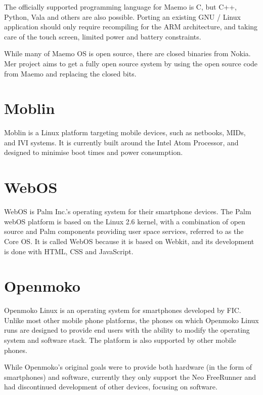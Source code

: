 \documentclass[12pt]{article}
\begin{document}

The officially supported programming language for Maemo is C, but C++, Python, Vala and others are also possible. Porting an existing GNU / Linux application should only require recompiling for the ARM architecture, and taking care of the touch screen, limited power and battery constraints.

While many of Maemo OS is open source, there are closed binaries from Nokia. Mer project aims to get a fully open source system by using the open source code from Maemo and replacing the closed bits\cite{maemo:mer}. 

\section{Moblin}

Moblin is a Linux platform targeting mobile devices, such as netbooks, MIDs, and IVI systems. It is currently built around the Intel Atom Processor, and designed to minimise boot times and power consumption\cite{moblin:about, wiki:moblin}.

\section{WebOS}

\nocite{wiki:WebOS}
WebOS is Palm Inc.'s operating system for their smartphone devices. The Palm webOS platform is based on the Linux 2.6 kernel, with a combination of open source\cite{WebOS:OSS} and Palm components providing user space services, referred to as the Core OS\cite{WebOS:architecture}. It is called WebOS because it is based on Webkit, and its development is done with HTML, CSS and JavaScript\cite{WebOS:developing}.

\section{Openmoko}

Openmoko Linux is an operating system for smartphones developed by FIC. Unlike most other mobile phone platforms, the phones on which Openmoko Linux runs are designed to provide end users with the ability to modify the operating system and software stack\cite{openmoko:about}. The platform is also supported by other mobile phones.

While Openmoko's original goals were to provide both hardware (in the form of smartphones) and software\cite{wiki:openmoko}, currently they only support the Neo FreeRunner and had discontinued development of other devices, focusing on software\cite{wiki:openmokoOS, slashdot:openmoko}. 
\end{document}
